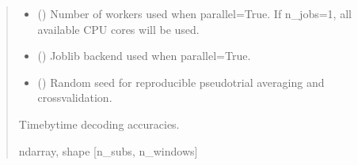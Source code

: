 \documentclass[letterpaper,10pt,english]{sphinxhowto}
\begin{document}
\begin{fulllineitems}
\begin{quote}
\begin{description}
\begin{itemize}
\item {} 
\sphinxAtStartPar
{} (\sphinxstyleliteralemphasis{\sphinxupquote{, }}) \textendash{} Number of workers used when parallel=True.
If n\_jobs=\sphinxhyphen{}1, all available CPU cores will be used.

\item {} 
\sphinxAtStartPar
{} (\sphinxstyleliteralemphasis{\sphinxupquote{, }}\sphinxstyleliteralemphasis{\sphinxupquote{, }}) \textendash{} Joblib backend used when parallel=True.

\item {} 
\sphinxAtStartPar
{} (\sphinxstyleliteralemphasis{\sphinxupquote{, }}) \textendash{} Random seed for reproducible pseudo\sphinxhyphen{}trial averaging and cross\sphinxhyphen{}validation.

\end{itemize}

\sphinxAtStartPar
{} \textendash{} Time\sphinxhyphen{}by\sphinxhyphen{}time decoding accuracies.

\sphinxAtStartPar
ndarray, shape {[}n\_subs, n\_windows{]}

\end{description}\end{quote}

\end{fulllineitems}

\end{document}
